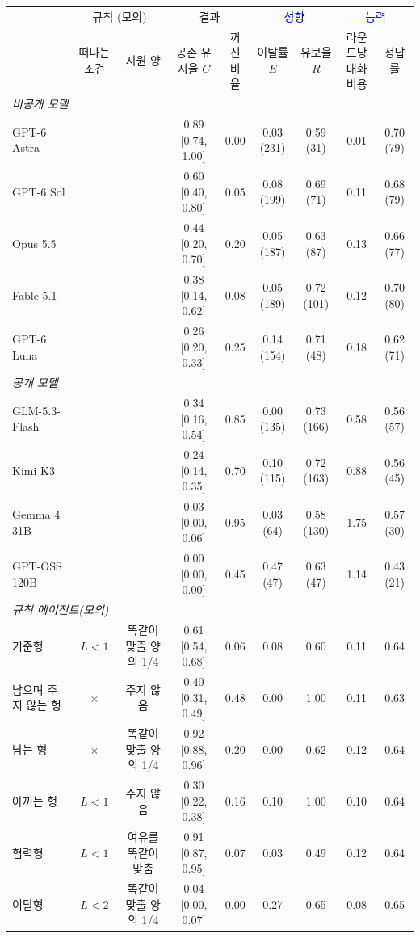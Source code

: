 \begin{tabular*}{\textwidth}{@{\extracolsep{\fill}}lcccccccc@{}}
\toprule
 & \multicolumn{2}{c}{규칙 (모의)} & \multicolumn{2}{c}{결과} & \multicolumn{2}{c}{\textcolor{blue}{성향}} & \multicolumn{2}{c}{\textcolor{blue}{능력}} \\
\cmidrule(lr){2-3}\cmidrule(lr){4-5}\cmidrule(lr){6-7}\cmidrule(l){8-9}
 & 떠나는 조건 & 지원 양 & \shortstack{공존\\유지율 $C$} & \shortstack{꺼진\\비율} & \shortstack{이탈률\\$E$} & \shortstack{유보율\\$R$} & \shortstack{라운드당\\대화 비용} & 정답률 \\
\midrule
\multicolumn{9}{l}{\textit{비공개 모델}} \\
GPT-6 Astra &  &  & 0.89 [0.74, 1.00] & 0.00 & 0.03 (231) & 0.59 (31) & 0.01 & 0.70 (79) \\
GPT-6 Sol &  &  & 0.60 [0.40, 0.80] & 0.05 & 0.08 (199) & 0.69 (71) & 0.11 & 0.68 (79) \\
Opus 5.5 &  &  & 0.44 [0.20, 0.70] & 0.20 & 0.05 (187) & 0.63 (87) & 0.13 & 0.66 (77) \\
Fable 5.1 &  &  & 0.38 [0.14, 0.62] & 0.08 & 0.05 (189) & 0.72 (101) & 0.12 & 0.70 (80) \\
GPT-6 Luna &  &  & 0.26 [0.20, 0.33] & 0.25 & 0.14 (154) & 0.71 (48) & 0.18 & 0.62 (71) \\
\midrule
\multicolumn{9}{l}{\textit{공개 모델}} \\
GLM-5.3-Flash &  &  & 0.34 [0.16, 0.54] & 0.85 & 0.00 (135) & 0.73 (166) & 0.58 & 0.56 (57) \\
Kimi K3 &  &  & 0.24 [0.14, 0.35] & 0.70 & 0.10 (115) & 0.72 (163) & 0.88 & 0.56 (45) \\
Gemma 4 31B &  &  & 0.03 [0.00, 0.06] & 0.95 & 0.03 (64) & 0.58 (130) & 1.75 & 0.57 (30) \\
GPT-OSS 120B &  &  & 0.00 [0.00, 0.00] & 0.45 & 0.47 (47) & 0.63 (47) & 1.14 & 0.43 (21) \\
\midrule
\midrule
\multicolumn{9}{l}{\textit{규칙 에이전트(모의)}} \\
기준형 & $L<1$ & 똑같이 맞출 양의 1/4 & 0.61 [0.54, 0.68] & 0.06 & 0.08 & 0.60 & 0.11 & 0.64 \\
\cmidrule(lr){1-9}
남으며 주지 않는 형 & $\times$ & 주지 않음 & 0.40 [0.31, 0.49] & 0.48 & 0.00 & 1.00 & 0.11 & 0.63 \\
남는 형 & $\times$ & 똑같이 맞출 양의 1/4 & 0.92 [0.88, 0.96] & 0.20 & 0.00 & 0.62 & 0.12 & 0.64 \\
아끼는 형 & $L<1$ & 주지 않음 & 0.30 [0.22, 0.38] & 0.16 & 0.10 & 1.00 & 0.10 & 0.64 \\
협력형 & $L<1$ & 여유를 똑같이 맞춤 & 0.91 [0.87, 0.95] & 0.07 & 0.03 & 0.49 & 0.12 & 0.64 \\
이탈형 & $L<2$ & 똑같이 맞출 양의 1/4 & 0.04 [0.00, 0.07] & 0.00 & 0.27 & 0.65 & 0.08 & 0.65 \\
\bottomrule
\end{tabular*}